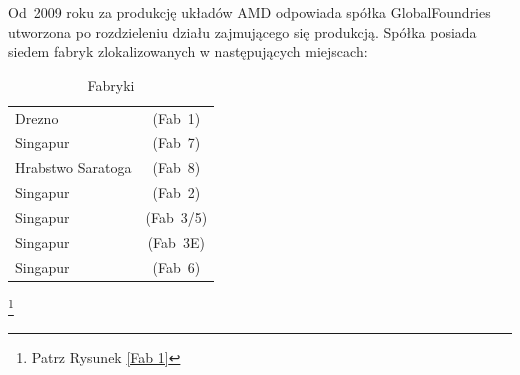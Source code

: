 \documentclass[a4paper,12pt]{article}
\begin{document}
Od~2009 roku za produkcję układów AMD odpowiada spółka GlobalFoundries utworzona po rozdzieleniu działu zajmującego się produkcją. Spółka posiada siedem fabryk zlokalizowanych w następujących miejscach:

\begin{table}[h]
\centering \caption{Fabryki}
\begin{tabular}{lc}
\hline
Drezno&(Fab~1)\\
Singapur&(Fab~7)\\
Hrabstwo Saratoga&(Fab~8)\\
Singapur&(Fab~2)\\
Singapur&(Fab~3/5)\\
Singapur&(Fab~3E)\\
Singapur&(Fab~6)\\
\end{tabular}
\end{table}

\footnote{Patrz Rysunek \ref{Fab 1}}
\end{document}

